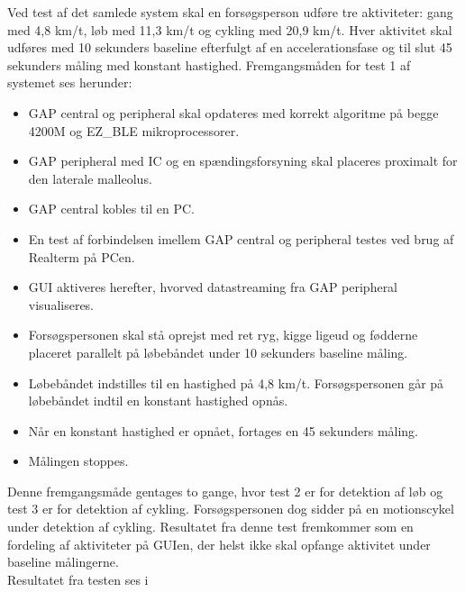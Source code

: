 Ved test af det samlede system skal en forsøgsperson udføre tre aktiviteter: gang med 4,8 km/t, løb med 11,3 km/t og cykling med 20,9 km/t. Hver aktivitet skal udføres med 10 sekunders baseline efterfulgt af en accelerationsfase og til slut 45 sekunders måling med konstant hastighed. Fremgangsmåden for test 1 af systemet ses herunder: 
\begin{itemize}
	\item GAP central og peripheral skal opdateres med korrekt algoritme på begge 4200M og EZ\_BLE mikroprocessorer.
	\item GAP peripheral med IC og en spændingsforsyning skal placeres proximalt for den laterale malleolus.
	\item GAP central kobles til en PC. 
	\item En test af forbindelsen imellem GAP central og peripheral testes ved brug af Realterm på PCen.
	\item GUI aktiveres herefter, hvorved datastreaming fra GAP peripheral visualiseres.
	\item Forsøgspersonen skal stå oprejst med ret ryg, kigge ligeud og fødderne placeret parallelt på løbebåndet under 10 sekunders baseline måling.
	\item Løbebåndet indstilles til en hastighed på 4,8 km/t. Forsøgspersonen går på løbebåndet indtil en konstant hastighed opnås.
	\item Når en konstant hastighed er opnået, fortages en 45 sekunders måling.
	\item Målingen stoppes.
\end{itemize}
Denne fremgangsmåde gentages to gange, hvor test 2 er for detektion af løb og test 3 er for detektion af cykling. Forsøgspersonen dog sidder på en motionscykel under detektion af cykling. Resultatet fra denne test fremkommer som en fordeling af aktiviteter på GUIen, der helst ikke skal opfange aktivitet under baseline målingerne. \\
Resultatet fra testen ses i 
